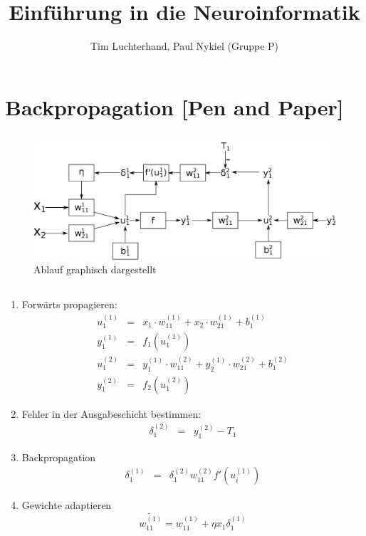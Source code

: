 \documentclass[DIN, pagenumber=false, fontsize=11pt, parskip=half]{scrartcl}
\title{Einführung in die Neuroinformatik}
\author{Tim Luchterhand, Paul Nykiel (Gruppe P)}
\begin{document}
    \maketitle
    \section{Backpropagation [Pen and Paper]}
    \subsection{}
	\begin{figure}[H]
		\centering
		\includegraphics[width=\textwidth]{Blatt5A1.eps}
		\caption{Ablauf graphisch dargestellt}
	\end{figure} 
    \subsection{}
    \begin{enumerate}
        \item Forwärts propagieren:
            \begin{eqnarray*}
                u_1^{(1)} &=& x_1 \cdot w_{11}^{(1)} + x_2 \cdot w_{21}^{(1)} + b_1^{(1)}\\
                y_1^{(1)} &=& f_1(u_1^{(1)}) \\
                u_1^{(2)} &=& y_1^{(1)} \cdot w_{11}^{(2)} + y_2^{(1)} \cdot w_{21}^{(2)} + b_1^{(2)}\\
                y_1^{(2)} &=& f_2(u_1^{(2)}) 
            \end{eqnarray*}
        \item Fehler in der Ausgabeschicht bestimmen:
            \begin{eqnarray*}
                \delta_1^{(2)} &=& y_1^{(2)} - T_1
            \end{eqnarray*}
        \item Backpropagation
            \begin{eqnarray*}
                \delta_1^{(1)} &=& \delta_1^{(2)} w_{11}^{(2)}f'\left(u_i^{(1)}\right)
            \end{eqnarray*}
        \item Gewichte adaptieren
            \begin{equation*}
                \tilde{w_{11}^{(1)}} =  w_{11}^{(1)} + \eta x_1 \delta_1^{(1)}
            \end{equation*}
    \end{enumerate}
    
\end{document}
